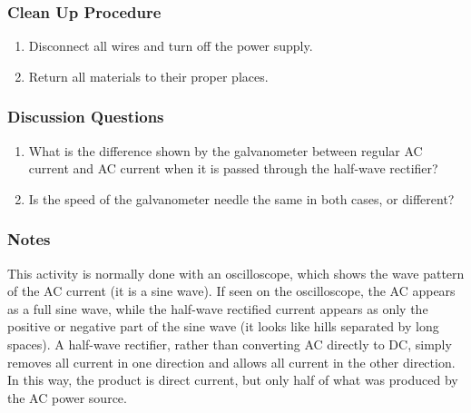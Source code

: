 \subsubsection*{Clean Up Procedure}
\begin{enumerate}
\item{Disconnect all wires and turn off the power supply.}
\item{Return all materials to their proper places.}
\end{enumerate}

\subsubsection*{Discussion Questions}
\begin{enumerate}
\item{What is the difference shown by the galvanometer between regular AC current and AC current when it is passed through the half-wave rectifier?}
\item{Is the speed of the galvanometer needle the same in both cases, or different?}
\end{enumerate}

\subsubsection*{Notes}
This activity is normally done with an oscilloscope, which shows the wave pattern of the AC current (it is a sine wave).  If seen on the oscilloscope, the AC appears as a full sine wave, while the half-wave rectified current appears as only the positive or negative part of the sine wave (it looks like hills separated by long spaces).
A half-wave rectifier, rather than converting AC directly to DC, simply removes all current in one direction and allows all current in the other direction.  In this way, the product is direct current, but only half of what was produced by the AC power source.





